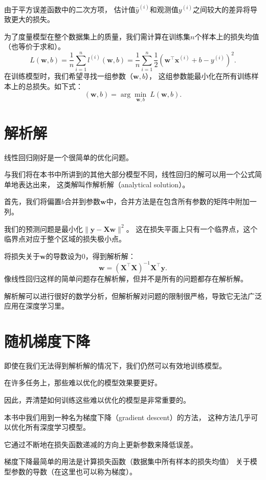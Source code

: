 \documentclass[openany,11pt]{book}
\begin{document}
由于平方误差函数中的二次方项，
估计值$\hat{y}^{(i)}$和观测值$y^{(i)}$之间较大的差异将导致更大的损失。

为了度量模型在整个数据集上的质量，我们需计算在训练集$n$个样本上的损失均值（也等价于求和）。
$$L(\mathbf{w}, b) =\frac{1}{n}\sum_{i=1}^n l^{(i)}(\mathbf{w}, b) =\frac{1}{n} \sum_{i=1}^n \frac{1}{2}\left(\mathbf{w}^\top \mathbf{x}^{(i)} + b - y^{(i)}\right)^2.$$
在训练模型时，我们希望寻找一组参数（$\mathbf{w}, b$），
这组参数能最小化在所有训练样本上的总损失。如下式：
$$(\mathbf{w}, b)= \arg\min_{\mathbf{w}, b}\  L(\mathbf{w}, b).$$



\chapter{解析解}

线性回归刚好是一个很简单的优化问题。

与我们将在本书中所讲到的其他大部分模型不同，线性回归的解可以用一个公式简单地表达出来，
这类解叫作解析解（analytical solution）。

首先，我们将偏置$b$合并到参数$\mathbf{w}$中，合并方法是在包含所有参数的矩阵中附加一列。

我们的预测问题是最小化$\|\mathbf{y} - \mathbf{X}\mathbf{w}\|^2$。
这在损失平面上只有一个临界点，这个临界点对应于整个区域的损失极小点。

将损失关于$\mathbf{w}$的导数设为0，得到解析解：
$$\mathbf{w}= (\mathbf X^\top \mathbf X)^{-1}\mathbf X^\top \mathbf{y}.$$
像线性回归这样的简单问题存在解析解，但并不是所有的问题都存在解析解。

解析解可以进行很好的数学分析，但解析解对问题的限制很严格，导致它无法广泛应用在深度学习里。



\chapter{随机梯度下降}

即使在我们无法得到解析解的情况下，我们仍然可以有效地训练模型。

在许多任务上，那些难以优化的模型效果要更好。

因此，弄清楚如何训练这些难以优化的模型是非常重要的。

本书中我们用到一种名为梯度下降（gradient descent）的方法，
这种方法几乎可以优化所有深度学习模型。

它通过不断地在损失函数递减的方向上更新参数来降低误差。

梯度下降最简单的用法是计算损失函数（数据集中所有样本的损失均值）
关于模型参数的导数（在这里也可以称为梯度）。
\end{document}
